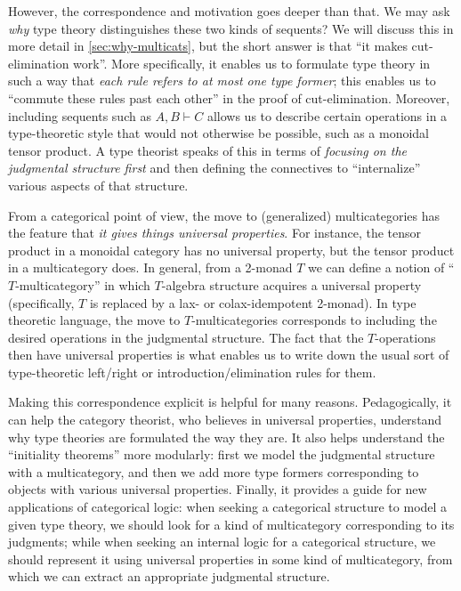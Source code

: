 \documentclass{book}
\let\types\vdash
\begin{document}
However, the correspondence and motivation goes deeper than that.
We may ask \emph{why} type theory distinguishes these two kinds of sequents?
We will discuss this in more detail in \cref{sec:why-multicats}, but the short answer is that ``it makes cut-elimination work''.
More specifically, it enables us to formulate type theory in such a way that \emph{each rule refers to at most one type former}; this enables us to ``commute these rules past each other'' in the proof of cut-elimination.
Moreover, including sequents such as $A,B\types C$ allows us to describe certain operations in a type-theoretic style that would not otherwise be possible, such as a monoidal tensor product.
A type theorist speaks of this in terms of \emph{focusing on the judgmental structure first} and then defining the connectives to ``internalize'' various aspects of that structure.

From a categorical point of view, the move to (generalized) multicategories has the feature that \emph{it gives things universal properties}.
For instance, the tensor product in a monoidal category has no universal property, but the tensor product in a multicategory does.
In general, from a 2-monad $T$ we can define a notion of ``$T$-multicategory'' in which $T$-algebra structure acquires a universal property (specifically, $T$ is replaced by a lax- or colax-idempotent 2-monad).
In type theoretic language, the move to $T$-multicategories corresponds to including the desired operations in the judgmental structure.
The fact that the $T$-operations then have universal properties is what enables us to write down the usual sort of type-theoretic left/right or introduction/elimination rules for them.

Making this correspondence explicit is helpful for many reasons.
Pedagogically, it can help the category theorist, who believes in universal properties, understand why type theories are formulated the way they are.
It also helps understand the ``initiality theorems'' more modularly: first we model the judgmental structure with a multicategory, and then we add more type formers corresponding to objects with various universal properties.
Finally, it provides a guide for new applications of categorical logic: when seeking a categorical structure to model a given type theory, we should look for a kind of multicategory corresponding to its judgments; while when seeking an internal logic for a categorical structure, we should represent it using universal properties in some kind of multicategory, from which we can extract an appropriate judgmental structure.
\end{document}
